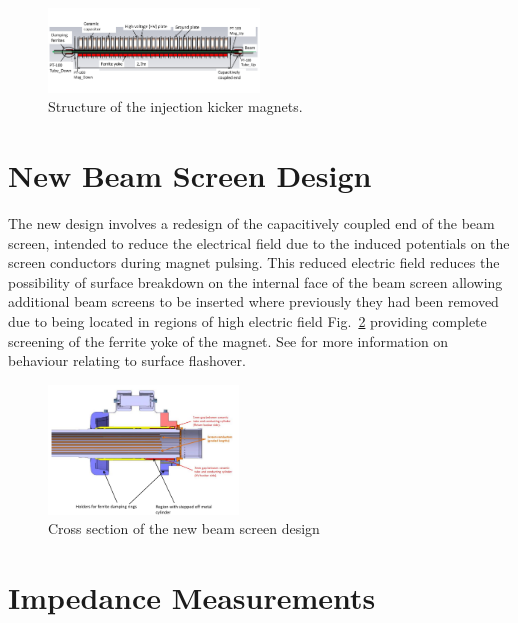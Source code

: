 \documentclass[a4paper,
              ]{jacow}
\begin{document}
\begin{figure}
\includegraphics[width=0.5\textwidth]{MKICrossSectionYZ.pdf}
\caption{Structure of the injection kicker magnets.}
\label{fig:mkiStruct}
\end{figure}

\section{New Beam Screen Design}

The new design involves a redesign of the capacitively coupled end of the beam screen, intended to reduce the electrical field due to the induced potentials on the screen conductors during magnet pulsing. This reduced electric field reduces the possibility of surface breakdown on the internal face of the beam screen allowing additional beam screens to be inserted where previously they had been removed due to being located in regions of high electric field Fig.~\ref{fig:beamScreenCross} providing complete screening of the ferrite yoke of the magnet. See \cite{mki-ElecBreakdown} for more information on behaviour relating to surface flashover. 

\begin{figure}
\begin{center}
\includegraphics[width=0.45\textwidth]{beamScreenCrossSectionLabelled.pdf}
\caption{Cross section of the new beam screen design}
\label{fig:beamScreenCross}
\end{center}
\end{figure}



\section{Impedance Measurements}
\end{document}
